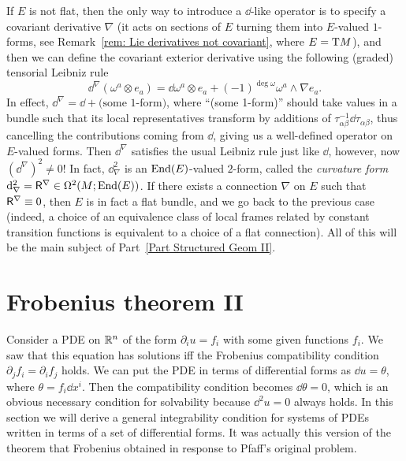 \begin{rem}
    If $E$ is not flat, then the only way to introduce a $\dd$-like operator is to specify a covariant derivative $\nabla$ (it acts on sections of $E$ turning them into $E$-valued $1$-forms, see Remark~\ref{rem: Lie derivatives not covariant}, where $E=\mathrm{T} M$), and then we can define the covariant exterior derivative using the following (graded) tensorial Leibniz rule
    \[\dd^\nabla(\omega^a\otimes e_a)=\dd\omega^a\otimes e_a+(-1)^{\deg \omega}\omega^a\wedge\nabla e_a.\]
    In effect, $\dd^\nabla=\dd +\text{(some 1-form)}$, where ``(some 1-form)'' should take values in a bundle such that its local representatives transform by additions of $\tau_{\alpha\beta}^{-1}\dd\tau_{\alpha\beta}$, thus cancelling the contributions coming from $\dd$, giving us a well-defined operator on $E$-valued forms.
    Then $\dd^\nabla$ satisfies the usual Leibniz rule just like $\dd$, however, now $(\dd^\nabla)^2\neq 0$! In fact, $\dd_\nabla^2$ is an $\operatorname{End}(E)$-valued $2$-form, called the \emph{curvature form} ${\mathrm{d}}_\nabla^2=\mathsf{R}^\nabla\in\Omega^2(M;\operatorname{End}(E))$. If there exists a connection $\nabla$ on $E$ such that $\mathsf{R}^\nabla\equiv 0$, then $E$ is in fact a flat bundle, and we go back to the previous case (indeed, a choice of an equivalence class of local frames related by constant transition functions is equivalent to a choice of a flat connection). All of this will be the main subject of Part~\ref{Part Structured Geom II}.
\end{rem}





\section{Frobenius theorem II}\label{sec: frobenius ii}


Consider a PDE on $\mathbb{R}^n$ of the form $\partial_i u=f_i$ with some given functions $f_i$. We saw that this equation has solutions iff the Frobenius compatibility condition $\partial_jf_i=\partial_i f_j$ holds. We can put the PDE in terms of differential forms as $\dd u=\theta$, where $\theta=f_i\dd x^i$. Then the compatibility condition becomes $\dd \theta=0$, which is an obvious necessary condition for solvability because $\dd ^2 u=0$ always holds. In this section we will derive a general integrability condition for systems of PDEs written in terms of a set of differential forms. It was actually this version of the theorem that Frobenius obtained in response to Pfaff's original problem.

